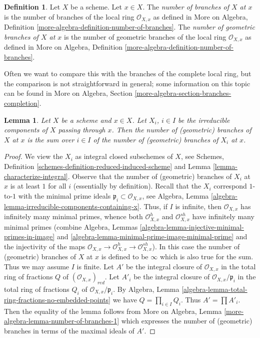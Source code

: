 \documentclass{stacks-project}
\theoremstyle{plain}
\newtheorem{lemma}[subsection]{Lemma}
\theoremstyle{definition}
\newtheorem{definition}[subsection]{Definition}
\theoremstyle{remark}
\numberwithin{equation}{subsection}
\begin{document}
\begin{definition}
\label{definition-number-of-branches}
Let $X$ be a scheme. Let $x \in X$. The {\it number of branches of $X$
at $x$} is the number of branches of the local ring $\mathcal{O}_{X, x}$
as defined in
More on Algebra, Definition \ref{more-algebra-definition-number-of-branches}.
The {\it number of geometric branches of $X$ at $x$} is the number of
geometric branches of the local ring $\mathcal{O}_{X, x}$ as defined in
More on Algebra, Definition \ref{more-algebra-definition-number-of-branches}.
\end{definition}

\noindent
Often we want to compare this with the branches of the complete local
ring, but the comparison is not straightforward in general; some information
on this topic can be found in More on Algebra, Section
\ref{more-algebra-section-branches-completion}.

\begin{lemma}
\label{lemma-number-of-branches-irreducible-components}
Let $X$ be a scheme and $x \in X$. Let $X_i$, $i \in I$ be the
irreducible components of $X$ passing through $x$.
Then the number of (geometric) branches of $X$ at $x$
is the sum over $i \in I$ of the number of (geometric)
branches of $X_i$ at $x$.
\end{lemma}

\begin{proof}
We view the $X_i$ as integral closed subschemes of $X$, see
Schemes, Definition \ref{schemes-definition-reduced-induced-scheme} and
Lemma \ref{lemma-characterize-integral}.
Observe that the number of (geometric) branches of $X_i$ at $x$
is at least $1$ for all $i$ (essentially by definition).
Recall that the $X_i$ correspond $1$-to-$1$ with the minimal
prime ideals $\mathfrak p_i \subset \mathcal{O}_{X, x}$, see
Algebra, Lemma \ref{algebra-lemma-irreducible-components-containing-x}.
Thus, if $I$ is infinite, then $\mathcal{O}_{X, x}$ has infinitely
many minimal primes, whence both $\mathcal{O}_{X, x}^h$
and $\mathcal{O}_{X, x}^{sh}$ have infinitely many minimal
primes (combine Algebra, Lemmas
\ref{algebra-lemma-injective-minimal-primes-in-image} and
\ref{algebra-lemma-minimal-prime-image-minimal-prime} and
the injectivity of the maps
$\mathcal{O}_{X, x} \to  \mathcal{O}_{X, x}^h \to \mathcal{O}_{X, x}^{sh}$).
In this case the number of (geometric) branches of $X$ at $x$
is defined to be $\infty$ which is also true for the sum.
Thus we may assume $I$ is finite.
Let $A'$ be the integral closure of $\mathcal{O}_{X, x}$
in the total ring of fractions $Q$ of $(\mathcal{O}_{X, x})_{red}$.
Let $A'_i$ be the  integral closure of $\mathcal{O}_{X, x}/\mathfrak p_i$
in the total ring of fractions $Q_i$ of $\mathcal{O}_{X, x}/\mathfrak p_i$.
By Algebra, Lemma \ref{algebra-lemma-total-ring-fractions-no-embedded-points}
we have $Q = \prod_{i \in I} Q_i$. Thus $A' = \prod A'_i$.
Then the equality of the lemma follows from
More on Algebra, Lemma \ref{more-algebra-lemma-number-of-branches-1}
which expresses the number of (geometric) branches in terms
of the maximal ideals of $A'$.
\end{proof}
\end{document}

